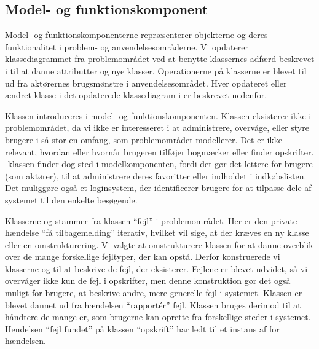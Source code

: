 \subsection{Model- og funktionskomponent}
\label{sec:modelfunktion}
%
Model- og funktionskomponenterne repræsenterer objekterne og deres funktionalitet i problem- og anvendelsesområderne. Vi opdaterer klassediagrammet fra problemområdet ved at benytte klassernes adfærd beskrevet i  til at danne attributter og nye klasser. Operationerne på klasserne er blevet til ud fra aktørernes brugsmønstre i anvendelsesområdet. Hver opdateret eller ændret klasse i det opdaterede klassediagram i  er beskrevet nedenfor.

Klassen  introduceres i model- og funktionskomponenten.
Klassen eksisterer ikke i problemområdet, da vi ikke er interesseret
i at administrere, overvåge, eller styre brugere i så stor en omfang,
som problemområdet modellerer. Det er \fx ikke relevant, hvordan
eller hvornår brugeren tilføjer bogmærker eller finder opskrifter.
-klassen finder dog sted i modelkomponenten, fordi
det gør det lettere for brugere (som aktører), til \fx at administrere
deres favoritter eller indholdet i indkøbslisten. Det muliggøre også et
loginsystem, der identificerer brugere for at tilpasse dele af systemet
til den enkelte besøgende.

Klasserne  og  stammer
fra klassen ``fejl'' i problemområdet. Her er den private hændelse
``få tilbagemelding'' iterativ, hvilket vil sige, at der kræves en ny
klasse eller en omstrukturering. Vi valgte at omstrukturere klassen
for at danne overblik over de mange forskellige fejltyper, der kan
opstå. Derfor konstruerede vi klasserne  og
 til at beskrive de fejl, der eksisterer. Fejlene
er blevet udvidet, så vi overvåger ikke kun de fejl i opskrifter,
men denne konstruktion gør det også muligt for brugere, at beskrive
andre, mere generelle fejl i systemet. Klassen 
er blevet dannet ud fra hændelsen ``rapport\'{e}r'' fejl. Klassen
 bruges derimod til at håndtere de mange
er, som brugerne kan oprette fra forskellige
steder i systemet. Hendelsen ``fejl fundet'' på klassen ``opskrift'' har
\fx ledt til et instans af  for hændelsen.

